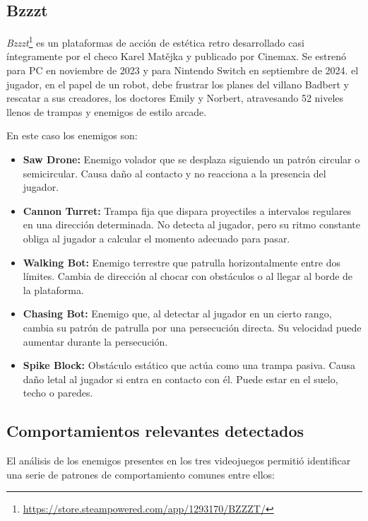 \subsection{Bzzzt}

\textit{Bzzzt}\footnote{\url{https://store.steampowered.com/app/1293170/BZZZT/}} es un plataformas de acción de estética retro desarrollado casi íntegramente por el checo Karel Matějka  y publicado por Cinemax. Se estrenó para PC en noviembre de 2023 y para Nintendo Switch en septiembre de 2024. el jugador, en el papel de un robot, debe frustrar los planes del villano Badbert y rescatar a sus creadores, los doctores Emily y Norbert, atravesando 52 niveles llenos de trampas y enemigos de estilo arcade.

En este caso los enemigos son:
\begin{itemize}
	\item \textbf{Saw Drone:} Enemigo volador que se desplaza siguiendo un patrón circular o semicircular. Causa daño al contacto y no reacciona a la presencia del jugador.
	\item \textbf{Cannon Turret:} Trampa fija que dispara proyectiles a intervalos regulares en una dirección determinada. No detecta al jugador, pero su ritmo constante obliga al jugador a calcular el momento adecuado para pasar.
	\item \textbf{Walking Bot:} Enemigo terrestre que patrulla horizontalmente entre dos límites. Cambia de dirección al chocar con obstáculos o al llegar al borde de la plataforma.
	\item \textbf{Chasing Bot:} Enemigo que, al detectar al jugador en un cierto rango, cambia su patrón de patrulla por una persecución directa. Su velocidad puede aumentar durante la persecución.
	\item \textbf{Spike Block:} Obstáculo estático que actúa como una trampa pasiva. Causa daño letal al jugador si entra en contacto con él. Puede estar en el suelo, techo o paredes.
\end{itemize}

\subsection{Comportamientos relevantes detectados}

El análisis de los enemigos presentes en los tres videojuegos permitió identificar una serie de patrones de comportamiento comunes entre ellos:


